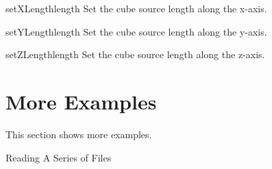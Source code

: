 \begin{methoddesc}[CubeSource]{setXLength}{length}
Set the cube source length along the x-axis.
\end{methoddesc}

\begin{methoddesc}[CubeSource]{setYLength}{length}
Set the cube source length along the y-axis.
\end{methoddesc}

\begin{methoddesc}[CubeSource]{setZLength}{length}
Set the cube source length along the z-axis.
\end{methoddesc}




\section{More Examples}
This section shows more examples.

\textsf{Reading A Series of Files}

